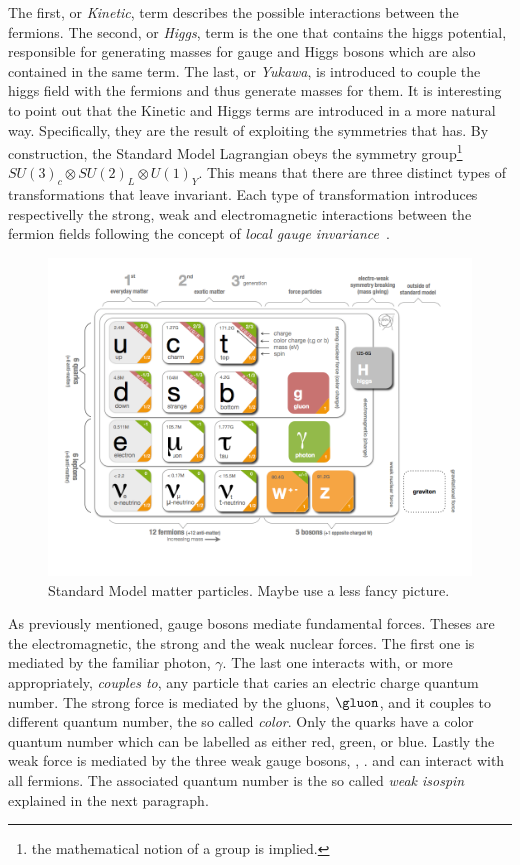 \noindent The first, or {\it Kinetic}, term describes the possible interactions between the fermions.
The second, or {\it Higgs}, term is the one that contains the higgs potential, responsible for generating
masses for gauge and Higgs bosons which are also contained in the same term.
The last, or {\it Yukawa}, is introduced to couple the higgs field with the fermions and thus generate masses for them.
It is interesting to point out that the Kinetic and Higgs terms are introduced in a more natural way.
Specifically, they are the result of exploiting the symmetries that  has.
By construction, the Standard Model Lagrangian obeys the symmetry group\footnote{the mathematical notion of a group is implied.}
$SU(3)_c\otimes SU(2)_L\otimes U(1)_Y$. This means that there are three distinct types of transformations
that leave  invariant. Each type of transformation introduces respectivelly the strong,
weak and electromagnetic interactions between the fermion fields following the concept of {\it local gauge invariance}~\cite{aitchison}.

\begin{figure}[h]
  \begin{center}
    \includegraphics[trim=1.4cm 0cm 5.95cm 0cm, clip=true, width=\textwidth]{Figures/Chapter1/Standard_model_infographic.png}
    \caption{Standard Model matter particles. {\color{red} Maybe use a less fancy picture.}}
    \label{sm_particles}
  \end{center}
\end{figure}

As previously mentioned, gauge bosons mediate fundamental forces. Theses are the electromagnetic, the strong and the weak nuclear forces.
The first one is mediated by the familiar photon, $\gamma$. The last one interacts with, or more appropriately, {\it couples to}, any particle that
caries an electric charge quantum number. The strong force is mediated by the gluons, $\gluon$, and it couples to different quantum number,
the so called {\it color}. Only the quarks have a color quantum number which can be labelled as either red, green, or blue. Lastly the
weak force is mediated by the three weak gauge bosons, \Wpm, \Z. and can interact with all fermions. The associated quantum number is
the so called {\it weak isospin} explained in the next paragraph.

